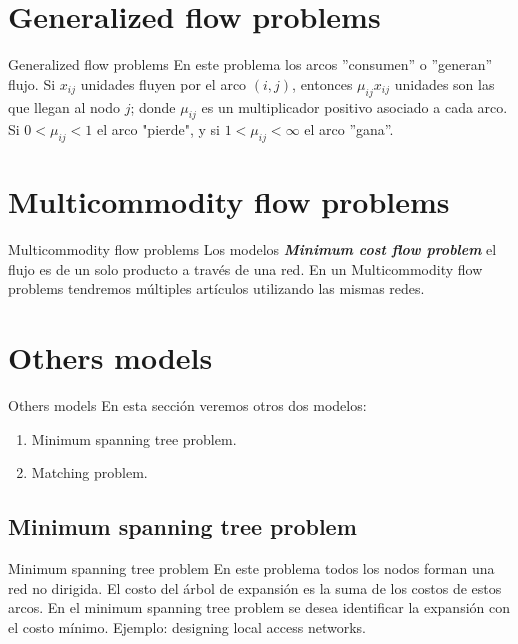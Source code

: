 \documentclass{beamer}
\newcommand{\mcf}{{\bfseries \textit{Minimum cost flow problem}} }
\begin{document}
\section{Generalized flow problems}
\begin{frame}{Generalized flow problems}
En este problema los arcos  ''consumen'' o ''generan'' flujo. Si $x_{ij}$ unidades  fluyen por el arco $(i,j)$, entonces $\mu_{ij} x_{ij}$ unidades son las que llegan al nodo $j$; donde $\mu_{ij}$ es un multiplicador positivo asociado a cada arco. Si $0<\mu_{ij}<1$ el arco "pierde", y si $1<\mu_{ij}< \infty$ el arco ''gana''.      
\end{frame}


\section{Multicommodity flow problems}

\begin{frame}{Multicommodity flow problems}
Los modelos \mcf el flujo es de un solo producto a través de una red. En un Multicommodity flow problems tendremos múltiples artículos utilizando las mismas redes.  
\end{frame}


\section{Others models}

\begin{frame}{Others models}
 En esta sección veremos otros dos modelos:
 \begin{enumerate}
  \item Minimum spanning tree problem.
  \item Matching problem.
 \end{enumerate}

\end{frame}

\subsection{Minimum spanning tree problem}

\begin{frame}{Minimum spanning tree problem}
 En este problema todos los nodos forman una red no dirigida. El costo del árbol de expansión es la suma de los costos de estos arcos. En el minimum spanning tree problem se desea identificar la expansión con el costo mínimo.
\newline Ejemplo: designing local access networks.
 \end{frame}
\end{document}
